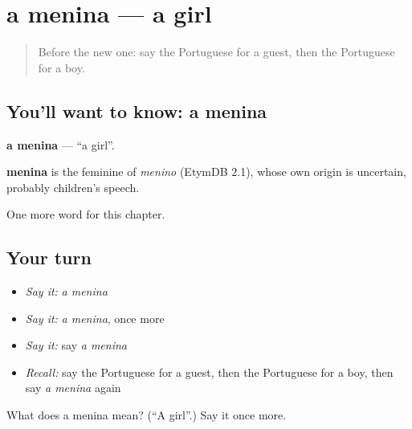 \section[a menina]{a menina — a girl}

\label{lesson:PT-C39-menina}



\begin{quote}
Before the new one: say the Portuguese for a guest, then the Portuguese for a boy.
\end{quote}

\subsection*{You'll want to know: a menina}
\textbf{a menina} — \textquotedblleft{}a girl\textquotedblright{}.

\begin{cousinweb}
\textbf{menina} is the feminine of \emph{menino} (EtymDB 2.1), whose own origin is uncertain, probably children's speech.
\end{cousinweb}

\begin{grammarlens}[title={What you've built}]
One more word for this chapter.
\end{grammarlens}

\subsection*{Your turn}
\begin{itemize}
\raggedright
  \item \emph{Say it:} \emph{a menina}
  \item \emph{Say it:} \emph{a menina}, once more
  \item \emph{Say it:} say \emph{a menina}
  \item \emph{Recall:} say the Portuguese for a guest, then the Portuguese for a boy, then say \emph{a menina} again
\end{itemize}

\begin{tcolorbox}[breakable,colback=teal!4,colframe=teal!35!black,title={Before you move on}]
What does a menina mean? (\textquotedblleft{}A girl\textquotedblright{}.) Say it once more.
\end{tcolorbox}
